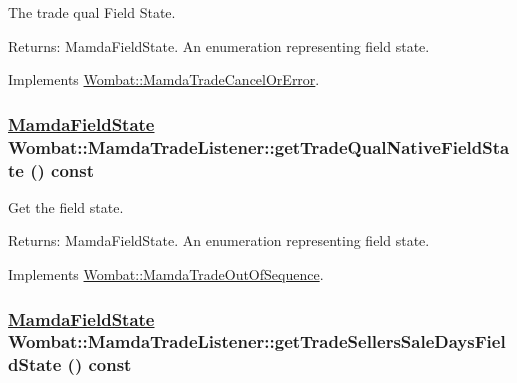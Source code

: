 The trade qual Field State. 

\begin{Desc}
\item[Returns:]Mamda\-Field\-State. An enumeration representing field state. \end{Desc}


Implements \hyperlink{classWombat_1_1MamdaTradeCancelOrError_db80e8a70132f714c2d351adac821cf7}{Wombat::Mamda\-Trade\-Cancel\-Or\-Error}.\hypertarget{classWombat_1_1MamdaTradeListener_2e60dd06819139125a4812e84d5803c0}{
\subsubsection[getTradeQualNativeFieldState]{\setlength{\rightskip}{0pt plus 5cm}\hyperlink{namespaceWombat_93aac974f2ab713554fd12a1fa3b7d2a}{Mamda\-Field\-State} Wombat::Mamda\-Trade\-Listener::get\-Trade\-Qual\-Native\-Field\-State () const}}
\label{classWombat_1_1MamdaTradeListener_2e60dd06819139125a4812e84d5803c0}


Get the field state. 

\begin{Desc}
\item[Returns:]Mamda\-Field\-State. An enumeration representing field state. \end{Desc}


Implements \hyperlink{classWombat_1_1MamdaTradeOutOfSequence_14b366022a0e2dd71b09b6d4693f44da}{Wombat::Mamda\-Trade\-Out\-Of\-Sequence}.\hypertarget{classWombat_1_1MamdaTradeListener_2090b9605a4191bf78b5cef58c7e1fbe}{
\subsubsection[getTradeSellersSaleDaysFieldState]{\setlength{\rightskip}{0pt plus 5cm}\hyperlink{namespaceWombat_93aac974f2ab713554fd12a1fa3b7d2a}{Mamda\-Field\-State} Wombat::Mamda\-Trade\-Listener::get\-Trade\-Sellers\-Sale\-Days\-Field\-State () const}}
\label{classWombat_1_1MamdaTradeListener_2090b9605a4191bf78b5cef58c7e1fbe}


